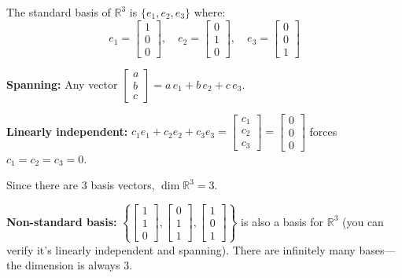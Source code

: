\documentclass[11pt]{article}
\theoremstyle{definition}
\theoremstyle{plain}
\theoremstyle{remark}
\begin{document}
\begin{workedexample}[title=\textbf{Worked Example: The standard basis of $\mathbb{R}^3$}]
The standard basis of $\mathbb{R}^3$ is $\{e_1, e_2, e_3\}$ where:
\[
e_1 = \begin{bmatrix}1\\0\\0\end{bmatrix}, \quad e_2 = \begin{bmatrix}0\\1\\0\end{bmatrix}, \quad e_3 = \begin{bmatrix}0\\0\\1\end{bmatrix}
\]

\textbf{Spanning:} Any vector $\begin{bmatrix}a\\b\\c\end{bmatrix} = a\,e_1 + b\,e_2 + c\,e_3$. \checkmark

\textbf{Linearly independent:} $c_1 e_1 + c_2 e_2 + c_3 e_3 = \begin{bmatrix}c_1\\c_2\\c_3\end{bmatrix} = \begin{bmatrix}0\\0\\0\end{bmatrix}$ forces $c_1 = c_2 = c_3 = 0$. \checkmark

Since there are 3 basis vectors, $\dim \mathbb{R}^3 = 3$.

\medskip
\textbf{Non-standard basis:} $\left\{\begin{bmatrix}1\\1\\0\end{bmatrix}, \begin{bmatrix}0\\1\\1\end{bmatrix}, \begin{bmatrix}1\\0\\1\end{bmatrix}\right\}$ is also a basis for $\mathbb{R}^3$ (you can verify it's linearly independent and spanning). There are infinitely many bases---the dimension is always 3.
\end{workedexample}
\end{document}
